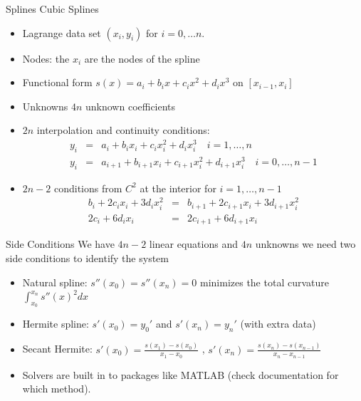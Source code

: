 \documentclass[xcolor=pdftex,dvipsnames,table,mathserif]{beamer}
\begin{document}
\begin{frame}{Splines}
Cubic Splines
\begin{itemize}
\item Lagrange data set $(x_i,y_i)$ for $i=0,\ldots n$.
\item Nodes: the $x_i$ are the nodes of the spline
\item Functional form $s(x) = a_i + b_i x + c_i x^2 + d_i x^3$ on $[x_{i-1},x_i]$
\item Unknowns $4n$ unknown coefficients
\item $2n$ interpolation and continuity conditions:
\begin{eqnarray*}
y_i &=& a_i + b_i x_i + c_i x_i^2 + d_i x_i^3 \quad i=1,\dots, n\\
y_i &=& a_{i+1} + b_{i+1} x_i + c_{i+1} x_i^2 + d_{i+1} x_i^3 \quad i=0,\ldots, n-1
\end{eqnarray*}
\item $2n - 2$ conditions from $C^2$ at the interior for $i=1,\ldots,n-1$
\begin{eqnarray*}
b_i + 2c_i x_i + 3 d_i x_i^2  &=& b_{i+1} + 2 c_{i+1} x_i + 3 d_{i+1}x_i^2\\ 
2c_i + 6d_i x_i &=& 2c_{i+1} + 6d_{i+1} x_i
\end{eqnarray*}
\end{itemize}
\end{frame}


\begin{frame}{Side Conditions}
We have $4n-2$ linear equations and $4n$ unknowns we need two side conditions to identify the system
\begin{itemize}
\item Natural spline: $s''(x_0) = s''(x_n) = 0$ minimizes the total curvature $\int_{x_0}^{x_n} s''(x)^2 dx$
\item Hermite spline: $s'(x_0) = y_0'$ and $s'(x_n) = y_n'$ (with extra data)
\item Secant Hermite: $s'(x_0) = \frac{s(x_1) - s(x_0)}{x_1-x_0}$ , $s'(x_n) = \frac{s(x_n) - s(x_{n-1})}{x_n-x_{n-1}}$
\item Solvers are built in to packages like MATLAB (check documentation for which method).
\end{itemize}
\end{frame}
\end{document}
